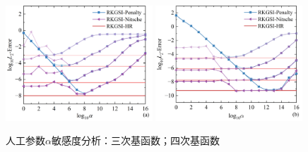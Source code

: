 \begin{figure}[H]
    \centering
    \begin{subcaptiongroup}
    \includegraphics[width=0.49\textwidth]{figure/PHR/R/calpha.png}
    \label{calpha}
    \includegraphics[width=0.49\textwidth]{figure/PHR/R/qalpha.png}
    \label{qalpha}
    \end{subcaptiongroup}
\caption{人工参数$\alpha$敏感度分析：三次基函数；四次基函数}
\label{Ralpha}
\end{figure}
\newpage
